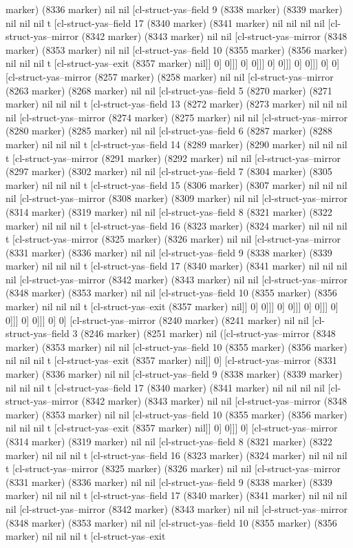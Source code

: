 {{marker) (8336 marker) nil nil [cl-struct-yas--field 9 (8338 marker) (8339 marker) nil nil nil t [cl-struct-yas--field 17 (8340 marker) (8341 marker) nil nil nil nil [cl-struct-yas--mirror (8342 marker) (8343 marker) nil nil [cl-struct-yas--mirror (8348 marker) (8353 marker) nil nil [cl-struct-yas--field 10 (8355 marker) (8356 marker) nil nil nil t [cl-struct-yas--exit (8357 marker) nil]] 0] 0]]] 0] 0]]] 0] 0]]] 0] 0]]] 0] 0] [cl-struct-yas--mirror (8257 marker) (8258 marker) nil nil [cl-struct-yas--mirror (8263 marker) (8268 marker) nil nil [cl-struct-yas--field 5 (8270 marker) (8271 marker) nil nil nil t [cl-struct-yas--field 13 (8272 marker) (8273 marker) nil nil nil nil [cl-struct-yas--mirror (8274 marker) (8275 marker) nil nil [cl-struct-yas--mirror (8280 marker) (8285 marker) nil nil [cl-struct-yas--field 6 (8287 marker) (8288 marker) nil nil nil t [cl-struct-yas--field 14 (8289 marker) (8290 marker) nil nil nil t [cl-struct-yas--mirror (8291 marker) (8292 marker) nil nil [cl-struct-yas--mirror (8297 marker) (8302 marker) nil nil [cl-struct-yas--field 7 (8304 marker) (8305 marker) nil nil nil t [cl-struct-yas--field 15 (8306 marker) (8307 marker) nil nil nil nil [cl-struct-yas--mirror (8308 marker) (8309 marker) nil nil [cl-struct-yas--mirror (8314 marker) (8319 marker) nil nil [cl-struct-yas--field 8 (8321 marker) (8322 marker) nil nil nil t [cl-struct-yas--field 16 (8323 marker) (8324 marker) nil nil nil t [cl-struct-yas--mirror (8325 marker) (8326 marker) nil nil [cl-struct-yas--mirror (8331 marker) (8336 marker) nil nil [cl-struct-yas--field 9 (8338 marker) (8339 marker) nil nil nil t [cl-struct-yas--field 17 (8340 marker) (8341 marker) nil nil nil nil [cl-struct-yas--mirror (8342 marker) (8343 marker) nil nil [cl-struct-yas--mirror (8348 marker) (8353 marker) nil nil [cl-struct-yas--field 10 (8355 marker) (8356 marker) nil nil nil t [cl-struct-yas--exit (8357 marker) nil]] 0] 0]]] 0] 0]]] 0] 0]]] 0] 0]]] 0] 0]]] 0] 0] [cl-struct-yas--mirror (8240 marker) (8241 marker) nil nil [cl-struct-yas--field 3 (8246 marker) (8251 marker) nil ([cl-struct-yas--mirror (8348 marker) (8353 marker) nil nil [cl-struct-yas--field 10 (8355 marker) (8356 marker) nil nil nil t [cl-struct-yas--exit (8357 marker) nil]] 0] [cl-struct-yas--mirror (8331 marker) (8336 marker) nil nil [cl-struct-yas--field 9 (8338 marker) (8339 marker) nil nil nil t [cl-struct-yas--field 17 (8340 marker) (8341 marker) nil nil nil nil [cl-struct-yas--mirror (8342 marker) (8343 marker) nil nil [cl-struct-yas--mirror (8348 marker) (8353 marker) nil nil [cl-struct-yas--field 10 (8355 marker) (8356 marker) nil nil nil t [cl-struct-yas--exit (8357 marker) nil]] 0] 0]]] 0] [cl-struct-yas--mirror (8314 marker) (8319 marker) nil nil [cl-struct-yas--field 8 (8321 marker) (8322 marker) nil nil nil t [cl-struct-yas--field 16 (8323 marker) (8324 marker) nil nil nil t [cl-struct-yas--mirror (8325 marker) (8326 marker) nil nil [cl-struct-yas--mirror (8331 marker) (8336 marker) nil nil [cl-struct-yas--field 9 (8338 marker) (8339 marker) nil nil nil t [cl-struct-yas--field 17 (8340 marker) (8341 marker) nil nil nil nil [cl-struct-yas--mirror (8342 marker) (8343 marker) nil nil [cl-struct-yas--mirror (8348 marker) (8353 marker) nil nil [cl-struct-yas--field 10 (8355 marker) (8356 marker) nil nil nil t [cl-struct-yas--exit }}
